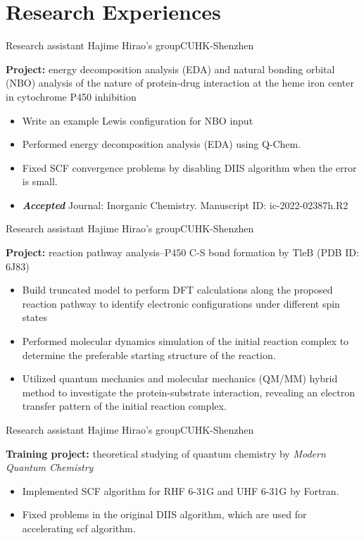 \documentclass[12pt,a4paper,sans]{moderncv}
\newcommand{\cvsection}[1]{\section{{#1}}}
\begin{document}
\vspace{-1em}
\cvsection{Research Experiences}
    {Research assistant}{}
    {Hajime Hirao's group}{CUHK-Shenzhen}
    {\small
    \textbf{Project:} energy decomposition analysis (EDA) and natural bonding orbital (NBO) analysis of
    the nature of protein-drug interaction at the heme iron center in cytochrome P450 inhibition
    \begin{itemize}[itemsep=2pt]
        \item Write an example Lewis configuration for NBO input
        \item Performed energy decomposition analysis (EDA) using Q-Chem.
        \item Fixed SCF convergence problems by disabling DIIS algorithm when the error is small.
        \item \textbf{\textit{Accepted}} Journal: Inorganic Chemistry. Manuscript ID: ic-2022-02387h.R2
    \end{itemize}
}
    {Research assistant}{}
    {Hajime Hirao's group}{CUHK-Shenzhen}
    {\small
    \textbf{Project:} reaction pathway analysis--P450 C-S bond formation by TleB (PDB ID: 6J83)
    \begin{itemize}[itemsep=2pt]
        \item Build truncated model to perform DFT calculations along the proposed reaction pathway to
        identify electronic configurations under different spin states
        \item Performed molecular dynamics simulation of the initial reaction complex to determine the preferable starting
        structure of the reaction.
        \item Utilized quantum mechanics and molecular mechanics (QM/MM) hybrid method to investigate the
        protein-substrate interaction, revealing an electron transfer pattern of the initial reaction complex.
    \end{itemize}
}
    {Research assistant}{}
    {Hajime Hirao's group}{CUHK-Shenzhen}
    {\small
    \textbf{Training project:} theoretical studying of quantum chemistry by \textit{Modern Quantum Chemistry}
    \begin{itemize}[itemsep=2pt]
        \item Implemented SCF algorithm for RHF 6-31G  and UHF 6-31G  by Fortran.
        \item Fixed problems in the original DIIS algorithm, which are used for accelerating scf algorithm.
    \end{itemize}
}
\end{document}
